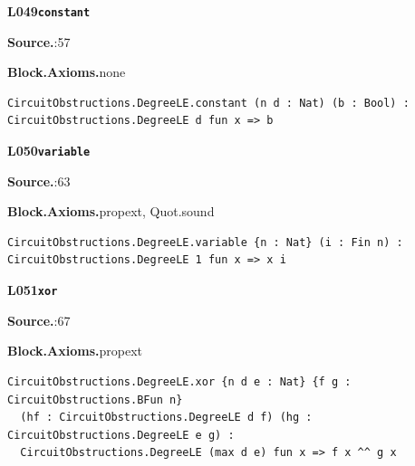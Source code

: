 \par\medskip\noindent\begin{minipage}{\textwidth}
{\small\bfseries L049\enspace\texttt{constant}\par}
{\footnotesize\raggedright\textbf{Source.}\enspace{}:57\par
\textbf{Block.}\quad\textbf{Axioms.}\enspace none\par}\nopagebreak
\begin{lstlisting}
CircuitObstructions.DegreeLE.constant (n d : Nat) (b : Bool) : CircuitObstructions.DegreeLE d fun x => b
\end{lstlisting}
\end{minipage}\par

\par\medskip\noindent\begin{minipage}{\textwidth}
{\small\bfseries L050\enspace\texttt{variable}\par}
{\footnotesize\raggedright\textbf{Source.}\enspace{}:63\par
\textbf{Block.}\quad\textbf{Axioms.}\enspace propext, Quot.sound\par}\nopagebreak
\begin{lstlisting}
CircuitObstructions.DegreeLE.variable {n : Nat} (i : Fin n) : CircuitObstructions.DegreeLE 1 fun x => x i
\end{lstlisting}
\end{minipage}\par

\par\medskip\noindent\begin{minipage}{\textwidth}
{\small\bfseries L051\enspace\texttt{xor}\par}
{\footnotesize\raggedright\textbf{Source.}\enspace{}:67\par
\textbf{Block.}\quad\textbf{Axioms.}\enspace propext\par}\nopagebreak
\begin{lstlisting}
CircuitObstructions.DegreeLE.xor {n d e : Nat} {f g : CircuitObstructions.BFun n}
  (hf : CircuitObstructions.DegreeLE d f) (hg : CircuitObstructions.DegreeLE e g) :
  CircuitObstructions.DegreeLE (max d e) fun x => f x ^^ g x
\end{lstlisting}
\end{minipage}\par

